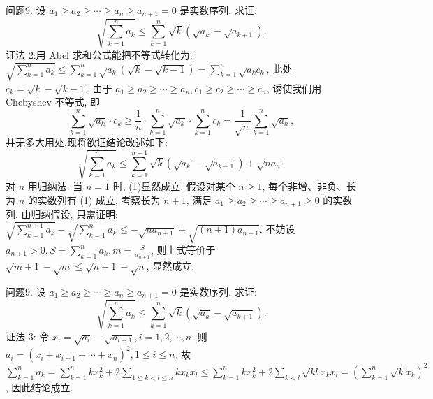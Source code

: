 问题9. 设 $a_1 \geqslant a_2 \geqslant \cdots \geqslant a_n \geqslant a_{n+1}=0$ 是实数序列, 求证:
$$
\sqrt{\sum_{k=1}^n a_k} \leqslant \sum_{k=1}^n \sqrt{k}\left(\sqrt{a_k}-\sqrt{a_{k+1}}\right) .
$$
证法 2:用 Abel 求和公式能把不等式转化为:
$\sqrt{\sum_{k=1}^n a_k} \leqslant \sum_{k=1}^n \sqrt{a_k}(\sqrt{k}-\sqrt{k-1})=\sum_{k=1}^n \sqrt{a_k c_k}$, 此处 $c_k=\sqrt{k}-\sqrt{k-1}$.
由于 $a_1 \geqslant a_2 \geqslant \cdots \geqslant a_n, c_1 \geqslant c_2 \geqslant \cdots \geqslant c_n$, 诱使我们用 Chebyshev 不等式, 即
$$
\sum_{k=1}^n \sqrt{a_k} \cdot c_k \geqslant \frac{1}{n} \cdot \sum_{k=1}^n \sqrt{a_k} \cdot \sum_{k=1}^n c_k=\frac{1}{\sqrt{n}} \sum_{k=1}^n \sqrt{a_k},
$$
并无多大用处,现将欲证结论改述如下:
$$
\sqrt{\sum_{k=1}^n a_k} \leqslant \sum_{k=1}^{n-1} \sqrt{k}\left(\sqrt{a_k}-\sqrt{a_{k+1}}\right)+\sqrt{n a_n} . \label{(1)}
$$
对 $n$ 用归纳法.
当 $n=1$ 时, (1)显然成立.
假设对某个 $n \geqslant 1$, 每个非增、非负、长为 $n$ 的实数列有 (1) 成立, 考察长为 $n+1$, 满足 $a_1 \geqslant a_2 \geqslant \cdots \geqslant a_{n+1} \geqslant 0$ 的实数列.
由归纳假设, 只需证明: $\sqrt{\sum_{k=1}^{n+1} a_k}- \sqrt{\sum_{k=1}^n a_k} \leqslant-\sqrt{n a_{n+1}}+\sqrt{(n+1) a_{n+1}}$. 不妨设 $a_{n+1}>0, S=\sum_{k=1}^n a_k, m=\frac{S}{a_{n+1}}$, 则上式等价于 $\sqrt{m+1}-\sqrt{m} \leqslant \sqrt{n+1}-\sqrt{n}$, 显然成立.



问题9. 设 $a_1 \geqslant a_2 \geqslant \cdots \geqslant a_n \geqslant a_{n+1}=0$ 是实数序列, 求证:
$$
\sqrt{\sum_{k=1}^n a_k} \leqslant \sum_{k=1}^n \sqrt{k}\left(\sqrt{a_k}-\sqrt{a_{k+1}}\right) .
$$
证法 3: 令 $x_i=\sqrt{a_i}-\sqrt{a_{i+1}}, i=1,2, \cdots, n$.
则 $a_i=\left(x_i+x_{i+1}+\cdots+x_n\right)^2, 1 \leqslant i \leqslant n$.
故 $\sum_{k=1}^n a_k=\sum_{k=1}^n k x_k^2+2 \sum_{1 \leqslant k<l \leqslant n} k x_k x_l \leqslant \sum_{k=1}^n k x_k^2+2 \sum_{k<l} \sqrt{k l} x_k x_l= \left(\sum_{k=1}^n \sqrt{k} x_k\right)^2$, 因此结论成立.



